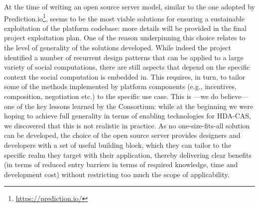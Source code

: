 At the time of writing an open source server model, similar to the one adopted by Prediction.io\footnote{\url{https://prediction.io/}}, seems to be the most viable solutions for ensuring a sustainable exploitation of the platform codebase: more details will be provided in the final project exploitation plan. One of the reason underpinning this choice relates to the level of generality of the solutions developed. While indeed the project identified a number of recurrent design patterns that can be applied to a large variety of social computations, there are still aspects that depend on the specific context the social computation is embedded in. This requires, in turn, to tailor some of the methods implemented by platform components (e.g., incentives, composition, negotiation etc.) to the specific use case. This is ---we do believe--- one of the key lessons learned by the Consortium: while at the beginning we were hoping to achieve full generality in terms of enabling technologies for HDA-CAS, we discovered that this is not realistic in practice. As no one-size-fits-all solution can be developed, the choice of the open source server provides designers and developers with a set of useful building block, which they can tailor to the specific realm they target with their application, thereby delivering clear benefits (in terms of reduced entry barriers in terms of required knowledge, time and development cost) without restricting too much the scope of applicability. 





